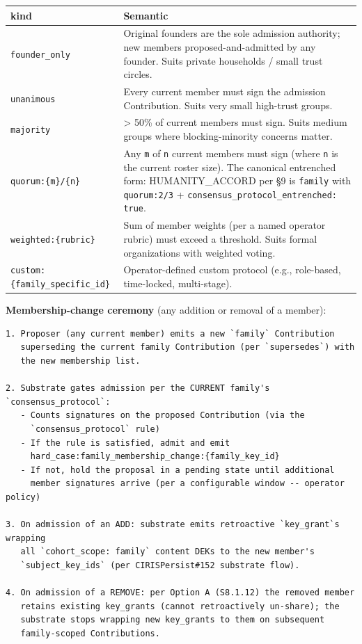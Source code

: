 \documentclass[11pt]{article}
\begin{document}
{\footnotesize
\begin{longtable}{|p{8.0cm}|p{8.0cm}|}\hline
\textbf{kind} & \textbf{Semantic} \\ \hline\endhead
\texttt{founder\_only} & Original founders are the sole admission authority; new members proposed-and-admitted by any founder. Suits private households / small trust circles. \\ \hline
\texttt{unanimous} & Every current member must sign the admission Contribution. Suits very small high-trust groups. \\ \hline
\texttt{majority} & > 50\% of current members must sign. Suits medium groups where blocking-minority concerns matter. \\ \hline
\texttt{quorum:\{m\}/\{n\}} & Any \texttt{m} of \texttt{n} current members must sign (where \texttt{n} is the current roster size). The canonical entrenched form: HUMANITY\_ACCORD per §9 is \texttt{family} with \texttt{quorum:2/3} + \texttt{consensus\_protocol\_entrenched: true}. \\ \hline
\texttt{weighted:\{rubric\}} & Sum of member weights (per a named operator rubric) must exceed a threshold. Suits formal organizations with weighted voting. \\ \hline
\texttt{custom:\{family\_specific\_id\}} & Operator-defined custom protocol (e.g., role-based, time-locked, multi-stage). \\ \hline
\end{longtable}}


\textbf{Membership-change ceremony} (any addition or removal of a member):


\begin{lstlisting}
1. Proposer (any current member) emits a new `family` Contribution
   superseding the current family Contribution (per `supersedes`) with
   the new membership list.

2. Substrate gates admission per the CURRENT family's `consensus_protocol`:
   - Counts signatures on the proposed Contribution (via the
     `consensus_protocol` rule)
   - If the rule is satisfied, admit and emit
     hard_case:family_membership_change:{family_key_id}
   - If not, hold the proposal in a pending state until additional
     member signatures arrive (per a configurable window -- operator policy)

3. On admission of an ADD: substrate emits retroactive `key_grant`s wrapping
   all `cohort_scope: family` content DEKs to the new member's
   `subject_key_ids` (per CIRISPersist#152 substrate flow).

4. On admission of a REMOVE: per Option A (S8.1.12) the removed member
   retains existing key_grants (cannot retroactively un-share); the
   substrate stops wrapping new key_grants to them on subsequent
   family-scoped Contributions.
\end{lstlisting}
\end{document}
